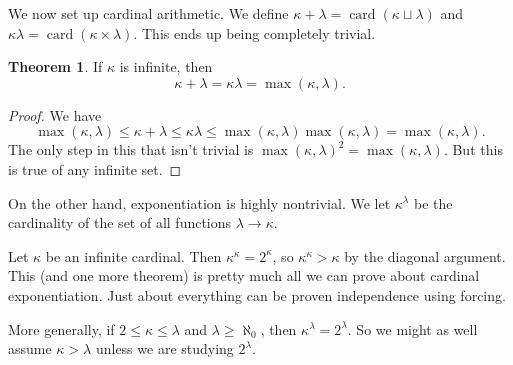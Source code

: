 \documentclass[12pt]{report}
\newcommand{\card}{\operatorname{card}}
\theoremstyle{definition}
\newtheorem{theorem}{Theorem}[chapter]
\begin{document}
We now set up cardinal arithmetic. We define $\kappa + \lambda = \card(\kappa \sqcup \lambda)$ and $\kappa\lambda = \card(\kappa \times \lambda)$. This ends up being completely trivial.
\begin{theorem}
If $\kappa$ is infinite, then
$$\kappa + \lambda = \kappa\lambda = \max(\kappa, \lambda).$$
\end{theorem}
\begin{proof}
We have
$$\max(\kappa, \lambda) \leq \kappa + \lambda \leq \kappa\lambda \leq \max(\kappa, \lambda) \max(\kappa, \lambda) = \max(\kappa, \lambda).$$
The only step in this that isn't trivial is $\max(\kappa, \lambda)^2 = \max(\kappa, \lambda)$. But this is true of any infinite set.
\end{proof}

On the other hand, exponentiation is highly nontrivial. We let $\kappa^\lambda$ be the cardinality of the set of all functions $\lambda \to \kappa$.

Let $\kappa$ be an infinite cardinal. Then $\kappa^\kappa = 2^\kappa$, so $\kappa^\kappa > \kappa$ by the diagonal argument. This (and one more theorem) is pretty much all we can prove about cardinal exponentiation. Just about everything can be proven independence using forcing.

More generally, if $2 \leq \kappa \leq \lambda$ and $\lambda \geq \aleph_0$, then $\kappa^\lambda = 2^\lambda$. So we might as well assume $\kappa > \lambda$ unless we are studying $2^\lambda$.
\end{document}
